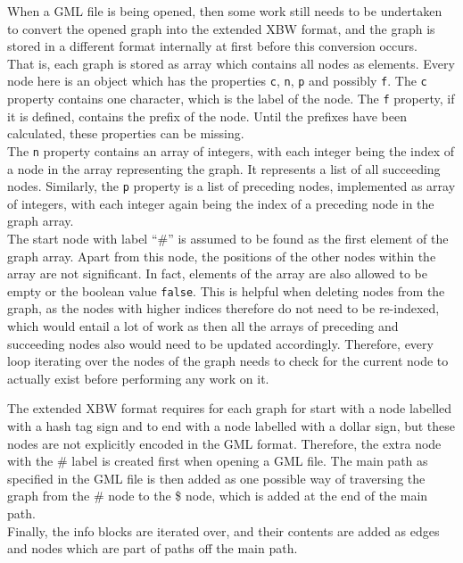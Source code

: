 \documentclass[a4paper,12pt,twoside,BCOR=10mm]{scrbook}
\begin{document}
When a GML file is being opened, then some work still needs to be undertaken
to convert the opened graph into the extended XBW format, and the graph is stored
in a different format internally at first before this conversion occurs. \\
That is, each graph is stored as array which contains all nodes as elements.
Every node here is an object which has the properties \texttt{c}, \texttt{n}, \texttt{p} and
possibly \texttt{f}. The \texttt{c} property contains one character, which is the label of the node.
The \texttt{f} property, if it is defined, contains the prefix of the node. Until the prefixes have
been calculated, these properties can be missing. \\
The \texttt{n} property contains an array of integers, with each integer being the index
of a node in the array representing the graph. It represents a list of all succeeding nodes.
Similarly, the \texttt{p} property is a list of preceding nodes, implemented as array of integers,
with each integer again being the index of a preceding node in the graph array. \\
The start node with label “$\#$” is assumed to be found as the first element
of the graph array. Apart from this node, the positions of the other nodes within
the array are not significant. In fact, elements of the array are also allowed to
be empty or the boolean value \texttt{false}. This is helpful when deleting
nodes from the graph, as the nodes with higher indices therefore do not need to be re-indexed,
which would entail a lot of work as then all the arrays of preceding and succeeding nodes
also would need to be updated accordingly.
Therefore, every loop iterating over the nodes of the graph needs to check for the
current node to actually exist before performing any work on it.

The extended XBW format requires for each graph for start with a node labelled with a
hash tag sign and to end with a node labelled with a dollar sign,
but these nodes are not explicitly encoded in the GML format.
Therefore, the extra node with the $\#$ label is created first when opening a GML file.
The main path as specified in the GML file is then added as one possible way
of traversing the graph from the $\#$ node to the \$ node, which is added at the end of the main path. \\
Finally, the info blocks are iterated over, and their contents are added as edges and nodes which are part
of paths off the main path.
\end{document}
